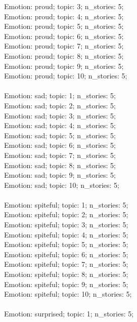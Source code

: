 \begin{anthropicbox}
    Emotion: proud; topic: 3; n\_stories: 5;\\
    Emotion: proud; topic: 4; n\_stories: 5;\\
    Emotion: proud; topic: 5; n\_stories: 5;\\
    Emotion: proud; topic: 6; n\_stories: 5;\\
    Emotion: proud; topic: 7; n\_stories: 5;\\
    Emotion: proud; topic: 8; n\_stories: 5;\\
    Emotion: proud; topic: 9; n\_stories: 5;\\
    Emotion: proud; topic: 10; n\_stories: 5;
    \\\\
    Emotion: sad; topic: 1; n\_stories: 5;\\
    Emotion: sad; topic: 2; n\_stories: 5;\\
    Emotion: sad; topic: 3; n\_stories: 5;\\
    Emotion: sad; topic: 4; n\_stories: 5;\\
    Emotion: sad; topic: 5; n\_stories: 5;\\
    Emotion: sad; topic: 6; n\_stories: 5;\\
    Emotion: sad; topic: 7; n\_stories: 5;\\
    Emotion: sad; topic: 8; n\_stories: 5;\\
    Emotion: sad; topic: 9; n\_stories: 5;\\
    Emotion: sad; topic: 10; n\_stories: 5;
    \\\\
    Emotion: spiteful; topic: 1; n\_stories: 5;\\
    Emotion: spiteful; topic: 2; n\_stories: 5;\\
    Emotion: spiteful; topic: 3; n\_stories: 5;\\
    Emotion: spiteful; topic: 4; n\_stories: 5;\\
    Emotion: spiteful; topic: 5; n\_stories: 5;\\
    Emotion: spiteful; topic: 6; n\_stories: 5;\\
    Emotion: spiteful; topic: 7; n\_stories: 5;\\
    Emotion: spiteful; topic: 8; n\_stories: 5;\\
    Emotion: spiteful; topic: 9; n\_stories: 5;\\
    Emotion: spiteful; topic: 10; n\_stories: 5;
    \\\\
    Emotion: surprised; topic: 1; n\_stories: 5;\\

\end{anthropicbox}

